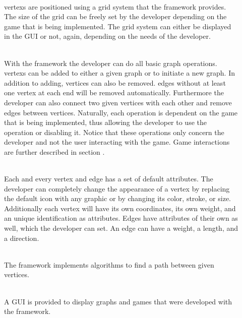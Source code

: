 \begin{description}
	\item[] \textbf{} \\
	\Glspl{vertex} are positioned using a grid system that the \gls{framework} provides. The size of the grid can be freely set by the \gls{developer} depending on the game that is being implemented. The grid system can either be displayed in the \gls{GUI} or not, again, depending on the needs of the developer.
  	\item[] \textbf{} \\
	With the framework the developer can do all basic graph operations. \Glspl{vertex} can be added to either a given \gls{graph} or to initiate a new graph. In addition to adding, vertices can also be removed. \Glspl{edge} without at least one vertex at each end will be removed automatically. Furthermore the developer can also connect two given vertices with each other and remove edges between vertices. Naturally, each operation is dependent on the game that is being implemented, thus allowing the developer to use the operation or disabling it. Notice that these operations only concern the developer and not the user interacting with the game. Game interactions are further described in section .
	\item[] \textbf{} \\
	Each and every vertex and edge has a set of default attributes. The developer can completely change the appearance of a vertex by replacing the default icon with any graphic or by changing its color, stroke, or size. \\
	Additionally each vertex will have its own coordinates, its own weight, and an unique identification as attributes. Edges have attributes of their own as well, which the developer can set. An edge can have a weight, a length, and a direction.
	\item[] \textbf{} \\
	The framework implements algorithms to find a path between given vertices.
 	\item[] \textbf{} \\
 	A \gls{GUI} is provided to display graphs and games that were developed with the framework. 

\end{description}
